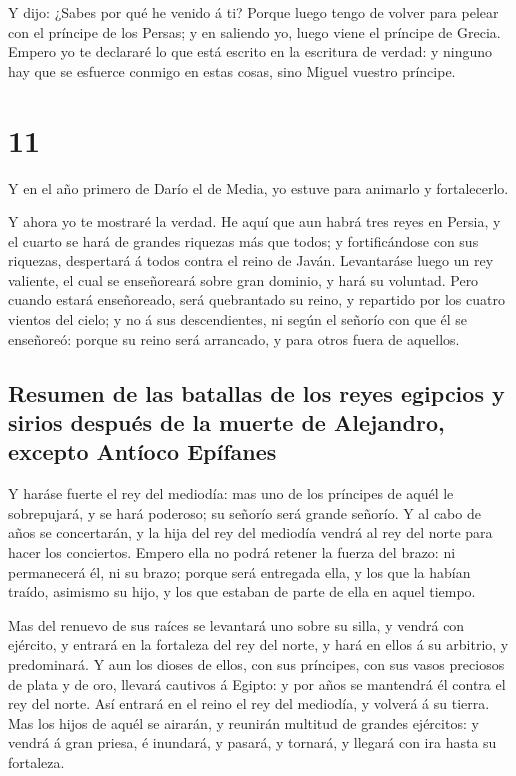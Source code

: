  Y dijo: ¿Sabes por qué he venido á ti? Porque luego
tengo de volver para pelear con el príncipe de los Persas; y en saliendo
yo, luego viene el príncipe de Grecia.  Empero yo te
declararé lo que está escrito en la escritura de verdad: y ninguno hay
que se esfuerce conmigo en estas cosas, sino Miguel vuestro príncipe.

\hypertarget{section-27-11}{%
\section{11}\label{section-27-11}}

 Y en el año primero de Darío el de Media, yo estuve para
animarlo y fortalecerlo.

 Y ahora yo te mostraré la verdad. He aquí que aun habrá
tres reyes en Persia, y el cuarto se hará de grandes riquezas más que
todos; y fortificándose con sus riquezas, despertará á todos contra el
reino de Javán.  Levantaráse luego un rey valiente, el
cual se enseñoreará sobre gran dominio, y hará su voluntad.
 Pero cuando estará enseñoreado, será quebrantado su
reino, y repartido por los cuatro vientos del cielo; y no á sus
descendientes, ni según el señorío con que él se enseñoreó: porque su
reino será arrancado, y para otros fuera de aquellos.

\hypertarget{resumen-de-las-batallas-de-los-reyes-egipcios-y-sirios-despuuxe9s-de-la-muerte-de-alejandro-excepto-antuxedoco-epuxedfanes}{%
\subsection{Resumen de las batallas de los reyes egipcios y sirios
después de la muerte de Alejandro, excepto Antíoco
Epífanes}\label{resumen-de-las-batallas-de-los-reyes-egipcios-y-sirios-despuuxe9s-de-la-muerte-de-alejandro-excepto-antuxedoco-epuxedfanes}}

 Y haráse fuerte el rey del mediodía: mas uno de los
príncipes de aquél le sobrepujará, y se hará poderoso; su señorío será
grande señorío.  Y al cabo de años se concertarán, y la
hija del rey del mediodía vendrá al rey del norte para hacer los
conciertos. Empero ella no podrá retener la fuerza del brazo: ni
permanecerá él, ni su brazo; porque será entregada ella, y los que la
habían traído, asimismo su hijo, y los que estaban de parte de ella en
aquel tiempo.

 Mas del renuevo de sus raíces se levantará uno sobre su
silla, y vendrá con ejército, y entrará en la fortaleza del rey del
norte, y hará en ellos á su arbitrio, y predominará.  Y
aun los dioses de ellos, con sus príncipes, con sus vasos preciosos de
plata y de oro, llevará cautivos á Egipto: y por años se mantendrá él
contra el rey del norte.  Así entrará en el reino el rey
del mediodía, y volverá á su tierra.  Mas los hijos de
aquél se airarán, y reunirán multitud de grandes ejércitos: y vendrá á
gran priesa, é inundará, y pasará, y tornará, y llegará con ira hasta su
fortaleza.

